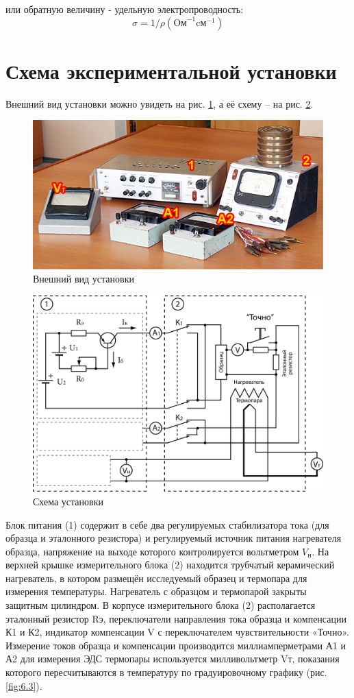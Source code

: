 или обратную величину - удельную электропроводность: 
$$\sigma=1 / \rho\left(\text{Oм}^{-1} \text{cм}^{-1}\right)$$

\section{Схема экспериментальной установки}
Внешний вид установки можно увидеть на рис. \ref{fig:6.1}, а её схему – на рис. \ref{fig:6.2}. 

\begin{figure}[h!]
	\centering
	\includegraphics[width = .9\linewidth]{img/ust.jpg}
	\caption{Внешний вид установки}
	\label{fig:6.1}
\end{figure}

\begin{figure}[h!]
	\centering
	\includegraphics[width = .9\linewidth]{img/scheme-2.jpg}
	\caption{Схема установки}
	\label{fig:6.2}
\end{figure}

Блок питания (1) содержит в себе два регулируемых стабилизатора тока (для образца и эталонного резистора) и регулируемый
источник питания нагревателя образца, напряжение на выходе которого контролируется вольтметром $V_\text{н}$. На верхней
крышке измерительного блока (2) находится трубчатый керамический нагреватель, в котором размещён исследуемый образец и
термопара для измерения температуры. Нагреватель с образцом и термопарой закрыты защитным цилиндром. В корпусе
измерительного блока (2) располагается эталонный резистор Rэ, переключатели направления тока образца и компенсации К1 и
К2, индикатор компенсации V с переключателем чувствительности «Точно». Измерение токов образца и компенсации
производится миллиамперметрами А1 и А2 для измерения ЭДС термопары используется милливольтметр Vт, показания которого
пересчитываются в температуру по градуировочному графику (рис. \ref{fig:6.3}).

